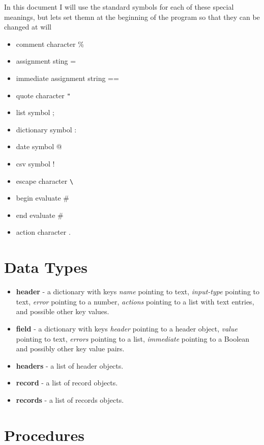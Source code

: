 \documentclass{article}
\begin{document}
In this document I will use the standard symbols for each of these
special meanings, but lets set themn at the beginning of the program
so that they can be changed at will
\begin{itemize}
  \item comment character \%
  \item assignment sting =
  \item immediate assignment string ==
  \item quote character \verb|"|
  \item list symbol ;
  \item dictionary symbol :
  \item date symbol @
  \item csv symbol !
  \item escape character \verb|\|
  \item begin evaluate \#
  \item end evaluate \#
  \item action character .
\end{itemize}
\section*{Data Types}

\begin{itemize}
\item \textbf{header} - a dictionary with keys \emph{name} pointing to
  text, \emph{input-type} pointing to text, \emph{error} pointing to a
  number, \emph{actions} pointing to a
  list with text entries, and possible other key values.  
\item \textbf{field} - a dictionary with keys \emph{header} pointing to a
  header object, \emph{value} pointing to text, \emph{errors} pointing
  to a list, \emph{immediate} pointing to a Boolean and possibly other key value pairs.  
\item \textbf{headers} - a list of header objects.
\item \textbf{record} - a list of record objects.
\item \textbf{records} - a list of records objects.  
\end{itemize}

\section*{Procedures}
 
\end{document}
